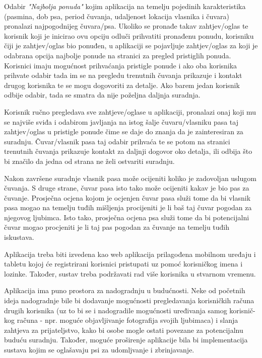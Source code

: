 		\begin{packed_item}
			
			\item Odabir \textit{"Najbolja ponuda"} kojim aplikacija na temelju pojedinih karakteristika (pasmina, dob psa, period čuvanja, udaljenost lokacija vlasnika i čuvara) pronalazi najpogodnijeg čuvara/psa. Ukoliko se pronađe takav zahtjev/oglas te korisnik koji je inicirao ovu opciju odluči prihvatiti pronađenu ponudu, korisniku čiji je zahtjev/oglas bio ponuđen, u aplikaciji se pojavljuje zahtjev/oglas za koji je odabrana opcija najbolje ponude na stranici za pregled pristiglih ponuda. Korisnici imaju mogućnost prihvaćanja pristigle ponude i ako oba korisnika prihvate odabir tada im se na pregledu trenutnih čuvanja prikazuje i kontakt drugog korisnika te se mogu dogovoriti za detalje. Ako barem jedan korisnik odbije odabir, tada se smatra da nije poželjna daljnja suradnja.
			\item Korisnik ručno pregledava sve zahtjeve/oglase u aplikaciji, pronalazi onaj koji mu se najviše sviđa i odabirom javljanja na istog šalje čuvaru/vlasniku pasa taj zahtjev/oglas u pristigle ponude čime se daje do znanja da je zainteresiran za suradnju. Čuvar/vlasnik pasa taj odabir prihvaća te se potom na stranici trenutnih čuvanja prikazuje kontakt za daljnji dogovor oko detalja, ili odbija što bi značilo da jedna od strana ne želi ostvariti suradnju.
			
		\end{packed_item}
		
		Nakon završene suradnje  vlasnik pasa može ocijeniti koliko je zadovoljan uslugom čuvanja. S druge strane, čuvar pasa isto tako može ocijeniti kakav je bio pas za čuvanje. Prosječna ocjena kojom je ocjenjen čuvar pasa služi tome da bi vlasnik pasa mogao na temelju tuđih mišljenja procijeniti je li baš taj čuvar pogodan za njegovog ljubimca. Isto tako, prosječna ocjena psa služi tome da bi potencijalni čuvar mogao procjeniti je li taj pas pogodan za čuvanje na temelju tuđih iskustava.
		
		Aplikacija treba biti izvedena kao web aplikacija prilagođena mobilnom uređaju i tabletu kojoj će registrirani korisnici pristupati uz pomoć korisničkog imena i lozinke. Također, sustav treba podržavati rad više korisnika u stvarnom vremenu.\newline
		
		
		
		Aplikacija ima puno prostora za nadogradnju u budućnosti. Neke od početnih ideja nadogradnje bile bi 
		dodavanje mogućnosti pregledavanja korisničkih računa drugih korisnika (uz to bi se i nadogradile mogućnosti uređivanja samog korisnič-kog računa - npr. moguće objavljivanje fotografija svojih ljubimaca) i slanja zahtjeva za prijateljstvo, kako bi osobe mogle ostati povezane za potencijalnu buduću suradnju. Također, moguće proširenje aplikacije bila bi implementacija sustava kojim se oglašavaju psi za udomljvanje i zbrinjavanje.\newline
		
